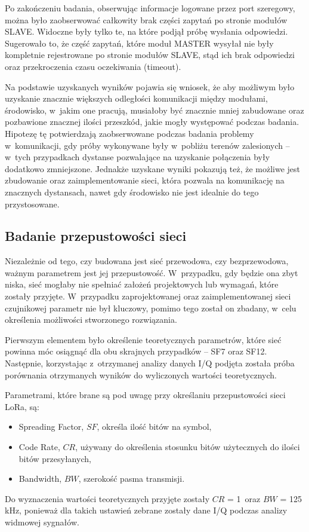 Po zakończeniu badania, obserwując informacje logowane przez port szeregowy, można było zaobserwować całkowity brak
części zapytań po stronie modułów SLAVE. Widoczne były tylko te, na które podjął próbę wysłania odpowiedzi. Sugerowało
to, że część zapytań, które moduł MASTER wysyłał nie były kompletnie rejestrowane po stronie modułów SLAVE, stąd ich
brak odpowiedzi oraz przekroczenia czasu oczekiwania (timeout).

Na podstawie uzyskanych wyników pojawia się wniosek, że aby możliwym było uzyskanie znacznie większych odległości
komunikacji między modułami, środowisko, w~jakim one pracują, musiałoby być znacznie mniej zabudowane oraz pozbawione
znacznej ilości przeszkód, jakie mogły występować podczas badania. Hipotezę tę potwierdzają zaobserwowane podczas
badania problemy w~komunikacji, gdy próby wykonywane były w~pobliżu terenów zalesionych -- w~tych przypadkach dystanse
pozwalające na uzyskanie połączenia były dodatkowo zmniejszone. Jednakże uzyskane wyniki pokazują też, że możliwe jest
zbudowanie oraz zaimplementowanie sieci, która pozwala na komunikację na znacznych dystansach, nawet gdy środowisko nie
jest idealnie do tego przystosowane.

\subsection{\label{sect:network-communication-bitrate}Badanie przepustowości sieci} Niezależnie od tego, czy budowana
jest sieć przewodowa, czy bezprzewodowa, ważnym parametrem jest jej przepustowość. W~przypadku, gdy będzie ona zbyt
niska, sieć mogłaby nie spełniać założeń projektowych lub wymagań, które zostały przyjęte. W~przypadku zaprojektowanej
oraz zaimplementowanej sieci czujnikowej parametr nie był kluczowy, pomimo tego został on zbadany, w~celu określenia
możliwości stworzonego rozwiązania.

Pierwszym elementem było określenie teoretycznych parametrów, które sieć powinna móc osiągnąć dla obu skrajnych
przypadków -- SF7 oraz SF12. Następnie, korzystając z~otrzymanej analizy danych I/Q podjęta została próba porównania
otrzymanych wyników do wyliczonych wartości teoretycznych.

Parametrami, które brane są pod uwagę przy określaniu przepustowości sieci LoRa, są:
\begin{itemize}[label=--]
    \item Spreading Factor, $\mathit{SF}$, określa ilość bitów na symbol,
    \item Code Rate, $\mathit{CR}$, używany do określenia stosunku bitów użytecznych do ilości bitów przesyłanych,
    \item Bandwidth, $\mathit{BW}$, szerokość pasma transmisji.
\end{itemize}
Do wyznaczenia wartości teoretycznych przyjęte zostały $\mathit{CR}$ = 1~oraz $\mathit{BW}$ = 125 kHz, ponieważ dla
takich ustawień zebrane zostały dane I/Q podczas analizy widmowej sygnałów.

